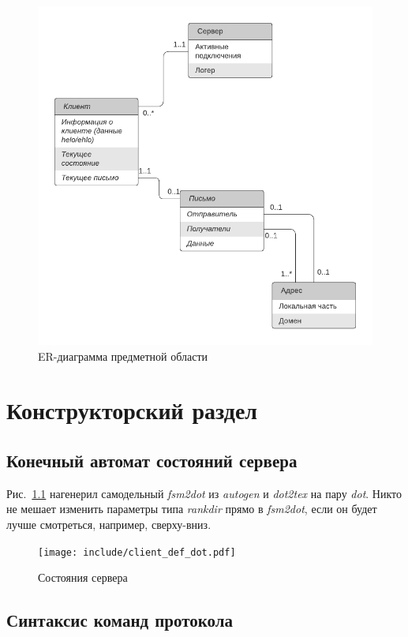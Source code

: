 \documentclass[a4paper,12pt]{report}
\begin{document}
\begin{figure}
\centering
\includegraphics[width=\textwidth]{diagramms/er.pdf}
\caption{ER-диаграмма предметной области}
\label{fig:er}
\end{figure}

\chapter{Конструкторский раздел}

\section{Конечный автомат состояний сервера}

Рис.~\ref{fig:fsm} нагенерил самодельный \textit{fsm2dot} из \textit{autogen} и \textit{dot2tex} на пару \textit{dot}. Никто не мешает изменить параметры типа \textit{rankdir} прямо в \textit{fsm2dot}, если он будет лучше смотреться, например, сверху-вниз.

\begin{figure}
\centering
\texttt{[image: include/client\_def\_dot.pdf]}
\caption{Состояния сервера}
\label{fig:fsm}
\end{figure}

\section{Синтаксис команд протокола}
\end{document}
